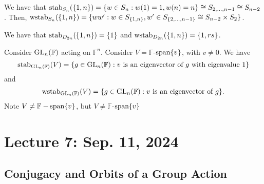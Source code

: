         \begin{example}
            We have that \(\operatorname{stab}_{S_n}(\{1,n\})=\{w\in S_n: w(1)=1, w(n)=n\}\cong S_{2,\ldots,n-1}\cong S_{n-2}\). Then, \(\operatorname{wstab}_{S_n}(\{1,n\})=\{ww':w\in S_{\{1,n\}}, w'\in S_{\{2,\ldots,n-1\}}\cong S_{n-2}\times S_2\}\).
        \end{example}
        \begin{example}
            We have that \(\operatorname{stab}_{D_{2n}}(\{1,n\})=\{1\}\) and \(\operatorname{wstab}_{D_{2n}}(\{1,n\})=\{1, rs\}\).
        \end{example}
        \begin{example}
            Consider \(\operatorname{GL}_n(\mathbb{F})\) acting on \(\mathbb{F}^n\). Consider \(V=\mathbb{F}\)-\(\operatorname{span}\{v\}\), with \(v\neq0\). We have
            \begin{equation*}
                \operatorname{stab}_{\operatorname{GL}_n(\mathbb{F})}(V)=\{g\in \operatorname{GL}_n(\mathbb{F}):v\text{ is an eigenvector of }g\text{ with eigenvalue }1\}
            \end{equation*}
            and
            \begin{equation*}
                \operatorname{wstab}_{\operatorname{GL}_n(\mathbb{F})}(V)=\{g\in \operatorname{GL}_n(\mathbb{F}):v\text{ is an eigenvector of }g\}.
            \end{equation*}
            Note \(V\neq\mathbb{F}-\operatorname{span}\{v\}\), but \(V\neq\mathbb{F}\)-\(\operatorname{span}\{v\}\)
        \end{example}

\pagebreak

\section{Lecture 7: Sep. 11, 2024}

    \subsection{Conjugacy and Orbits of a Group Action}


